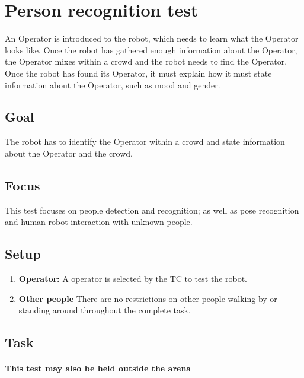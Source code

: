 \section{Person recognition test}

An Operator is introduced to the robot, which needs to learn what the Operator looks like. Once the robot has gathered enough information about the Operator, the Operator mixes within a crowd and the robot needs to find the Operator. Once the robot has found its Operator, it must explain how it must state information about the Operator, such as mood and gender.

\subsection{Goal}
The robot has to identify the Operator within a crowd and state information about the Operator and the crowd.

\subsection{Focus}

This test focuses on people detection and recognition; as well as pose recognition and human-robot interaction with unknown people.

\subsection{Setup}

\begin{enumerate}
\item \textbf{Operator:} A  operator is selected by the TC to test the robot.
\item \textbf{Other people} There are no restrictions on other people walking by or standing around throughout the complete task.
\end{enumerate}

\subsection{Task}
\paragraph{This test may also be held outside the arena}

